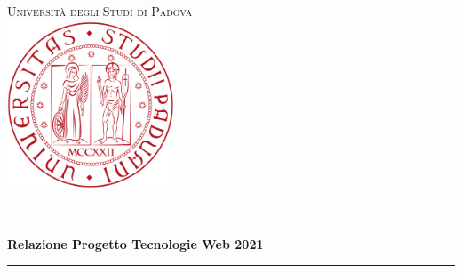 \begin{titlepage}
    
    \newcommand{\HRule}{\rule{\linewidth}{0.5mm}} 
    
    \center
    
    
    \textsc{\LARGE Università degli Studi di Padova}\\[1cm] 
    
    
    \includegraphics[height=5cm]{img/UniPd.png}\\[1cm]
    
    
    

    
    
    \HRule \\[0.4cm]
    { \huge \bfseries Relazione Progetto Tecnologie Web 2021}\\[0.4cm] %
    \HRule \\[1.5cm]
    
    
    \vspace{1.5cm}
    

\end{titlepage}
